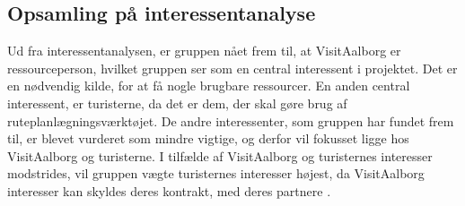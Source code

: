 \subsection{Opsamling på interessentanalyse}
Ud fra interessentanalysen, er gruppen nået frem til, at VisitAalborg er ressourceperson, hvilket gruppen ser som en central interessent i projektet. Det er en nødvendig kilde, for at få nogle brugbare ressourcer. En anden central interessent, er turisterne, da det er dem, der skal gøre brug af ruteplanlægningsværktøjet. 
De andre interessenter, som gruppen har fundet frem til, er blevet vurderet som mindre vigtige, og derfor vil fokusset ligge hos VisitAalborg og turisterne. 
I tilfælde af VisitAalborg og turisternes interesser modstrides, vil gruppen vægte turisternes interesser højest, da VisitAalborg interesser kan skyldes deres kontrakt, med deres partnere \citep{VA}. 




